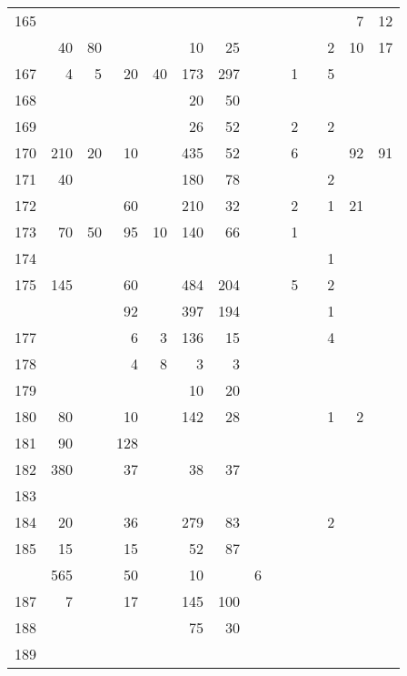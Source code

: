 \documentclass[
]{article}
\begin{document}
\begin{longtable}[l]{rrrrrrrrrrrrrr}
\rowcolor{lightgray}  165 &  &  &  &  &  &  &  &  &  &  &  & 7 & 12\\
\addlinespace
166 & 40 & 80 &  &  & 10 & 25 &  &  &  &  & 2 & 10 & 17\\
\rowcolor{lightgray}  167 & 4 & 5 & 20 & 40 & 173 & 297 &  &  & 1 &  & 5 &  & \\
168 &  &  &  &  & 20 & 50 &  &  &  &  &  &  & \\
\rowcolor{lightgray}  169 &  &  &  &  & 26 & 52 &  &  & 2 &  & 2 &  & \\
170 & 210 & 20 & 10 &  & 435 & 52 &  &  & 6 &  &  & 92 & 91\\
\addlinespace
\rowcolor{lightgray}  171 & 40 &  &  &  & 180 & 78 &  &  &  &  & 2 &  & \\
172 &  &  & 60 &  & 210 & 32 &  &  & 2 &  & 1 & 21 & \\
\rowcolor{lightgray}  173 & 70 & 50 & 95 & 10 & 140 & 66 &  &  & 1 &  &  &  & \\
174 &  &  &  &  &  &  &  &  &  &  & 1 &  & \\
\rowcolor{lightgray}  175 & 145 &  & 60 &  & 484 & 204 &  &  & 5 &  & 2 &  & \\
\addlinespace
176 &  &  & 92 &  & 397 & 194 &  &  &  &  & 1 &  & \\
\rowcolor{lightgray}  177 &  &  & 6 & 3 & 136 & 15 &  &  &  &  & 4 &  & \\
178 &  &  & 4 & 8 & 3 & 3 &  &  &  &  &  &  & \\
\rowcolor{lightgray}  179 &  &  &  &  & 10 & 20 &  &  &  &  &  &  & \\
180 & 80 &  & 10 &  & 142 & 28 &  &  &  &  & 1 & 2 & \\
\addlinespace
\rowcolor{lightgray}  181 & 90 &  & 128 &  &  &  &  &  &  &  &  &  & \\
182 & 380 &  & 37 &  & 38 & 37 &  &  &  &  &  &  & \\
\rowcolor{lightgray}  183 &  &  &  &  &  &  &  &  &  &  &  &  & \\
184 & 20 &  & 36 &  & 279 & 83 &  &  &  &  & 2 &  & \\
\rowcolor{lightgray}  185 & 15 &  & 15 &  & 52 & 87 &  &  &  &  &  &  & \\
\addlinespace
186 & 565 &  & 50 &  & 10 &  & 6 &  &  &  &  &  & \\
\rowcolor{lightgray}  187 & 7 &  & 17 &  & 145 & 100 &  &  &  &  &  &  & \\
188 &  &  &  &  & 75 & 30 &  &  &  &  &  &  & \\
\rowcolor{lightgray}  189 &  &  &  &  &  &  &  &  &  &  &  &  & \\

\end{longtable}
\end{document}
